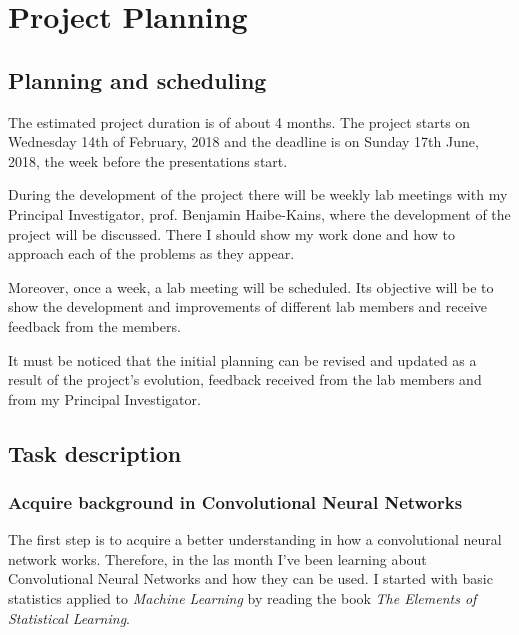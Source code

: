 

\section{Project Planning}

\subsection{Planning and scheduling}

The estimated project duration is of about 4 months. The project starts on Wednesday 14th of 
February, 2018 and the deadline is on Sunday 17th June, 2018, the week before the 
presentations start.

During the development of the project there will be weekly lab meetings with my Principal
Investigator, prof. Benjamin Haibe-Kains, where the development of the project will be 
discussed. There I should show my work done and how to approach each of the problems as
they appear.

Moreover, once a week, a lab meeting will be scheduled. Its objective will be to show
the development and improvements of different lab members and receive feedback from the 
members.

It must be noticed that the initial planning can be revised and updated as a result of the 
project's evolution, feedback received from the lab members and from my Principal Investigator. 

\subsection{Task description}

\subsubsection{Acquire background in Convolutional Neural Networks}

The first step is to acquire a better understanding in how a convolutional neural network works.
Therefore, in the las month I've been learning about Convolutional Neural Networks and how they
can be used. 
I started with basic statistics applied to \emph{Machine Learning} by reading the book 
\emph{The Elements of Statistical Learning}.~\cite{neural:ElementsStatisticalLearning}

